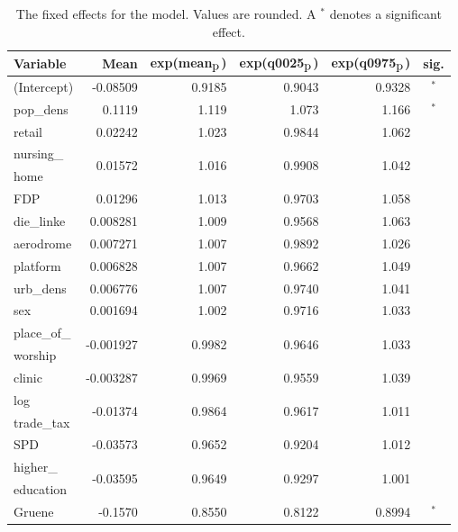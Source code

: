 \begin{table}[H]
\caption{The fixed effects for the model. Values are rounded. A $^*$ denotes a significant effect. \label{FixedAllGermany_spatial}}
\begin{tabular}{l r r r r c}
\toprule
\textbf{Variable}	& \textbf{Mean}	& \textbf{exp(mean$_{\hbox{p}}$)} & \textbf{exp(q0025$_{\hbox{p}}$)} & \textbf{exp(q0975$_{\hbox{p}}$)} & \textbf{sig.}\\
\midrule
(Intercept) & -0.08509 & 0.9185 & 0.9043 & 0.9328 & $^*$\\
pop\_dens & 0.1119 & 1.119 & 1.073 & 1.166 & $^*$\\
retail & 0.02242 & 1.023 & 0.9844 & 1.062 \\
nursing\_ & \multirow{2}{*}{0.01572} & \multirow{2}{*}{1.016} & \multirow{2}{*}{0.9908} & \multirow{2}{*}{1.042} \\
home \\
FDP & 0.01296 & 1.013 & 0.9703 & 1.058 &\\
die\_linke & 0.008281 & 1.009 & 0.9568 & 1.063\\
aerodrome & 0.007271 & 1.007 & 0.9892 & 1.026 \\
platform & 0.006828 & 1.007 & 0.9662 & 1.049 \\
urb\_dens & 0.006776 & 1.007 & 0.9740 & 1.041 \\
sex & 0.001694 & 1.002 & 0.9716 & 1.033 &\\
place\_of\_ & \multirow{2}{*}{-0.001927} & \multirow{2}{*}{0.9982} & \multirow{2}{*}{0.9646} & \multirow{2}{*}{1.033} \\
worship \\
clinic & -0.003287 & 0.9969 & 0.9559 & 1.039 \\
log & \multirow{2}{*}{-0.01374} & \multirow{2}{*}{0.9864} & \multirow{2}{*}{0.9617} & \multirow{2}{*}{1.011}\\
trade\_tax \\
SPD & -0.03573 & 0.9652 & 0.9204 & 1.012 \\
higher\_ & \multirow{2}{*}{-0.03595} & \multirow{2}{*}{0.9649} & \multirow{2}{*}{0.9297} & \multirow{2}{*}{1.001} \\
education \\
Gruene & -0.1570 & 0.8550 & 0.8122 & 0.8994 & $^*$\\
\bottomrule
\end{tabular}
\end{table}
